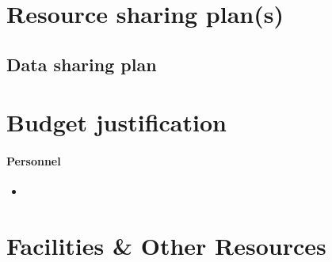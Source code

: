\documentclass[11pt]{article}
\newcommand{\instructions}[1]{}
\begin{document}
\section*{Resource sharing plan(s)}

\subsection*{Data sharing plan}

\clearpage
\section*{Budget justification}

\paragraph{Personnel}

\begin{itemize}

\item 
\end{itemize}

\clearpage
\section*{Facilities \& Other Resources}

\instructions{ Instructions: This information is used to assess the
    capability of the organizational resources available to perform
    the effort proposed.  Identify the facilities to be used
    (laboratory, clinical, animal, computer, office, other). If
    appropriate, indicate their capacities, pertinent capabilities,
    relative proximity and extent of availability to the
    project. Describe only those resources that are directly
    applicable to the proposed work. Provide any information
    describing the Other Resources available to the project (e.g.,
    machine shop, electronic shop) and the extent to which they would
    be available to the project.  Describe how the scientific
    environment in which the research will be done contributes to the
    probability of success (e.g., institutional support, physical
    resources, and intellectual rapport). In describing the scientific
    environment in which the work will be done, discuss ways in which
    the proposed studies will benefit from unique features of the
    scientific environment or subject populations or will employ
    useful collaborative arrangements.}
\end{document}

